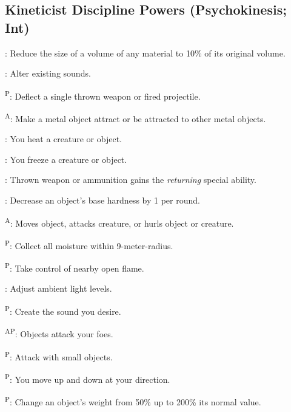 \subsection{Kineticist Discipline Powers {\normalsize(Psychokinesis; Int)}}
\begin{enumerate*}
\item {}: Reduce the size of a volume of any material to 10\% of its original volume.

      : Alter existing sounds.

      \textsuperscript{P}: Deflect a single thrown weapon or fired projectile.

      \textsuperscript{A}: Make a metal object attract or be attracted to other metal objects.

      : You heat a creature or object.

      : You freeze a creature or object.

      : Thrown weapon or ammunition gains the \emph{returning} special ability.

      : Decrease an object's base hardness by 1 per round.

      \textsuperscript{A}: Moves object, attacks creature, or hurls object or creature.

\item {}\textsuperscript{P}: Collect all moisture within 9-meter-radius.

      \textsuperscript{P}: Take control of nearby open flame.

      : Adjust ambient light levels.

      \textsuperscript{P}: Create the sound you desire.
      
\item {}\textsuperscript{AP}: Objects attack your foes.

      \textsuperscript{P}: Attack with small objects.

      \textsuperscript{P}: You move up and down at your direction.

      \textsuperscript{P}: Change an object's weight from 50\% up to 200\% its normal value.


\end{enumerate*}
